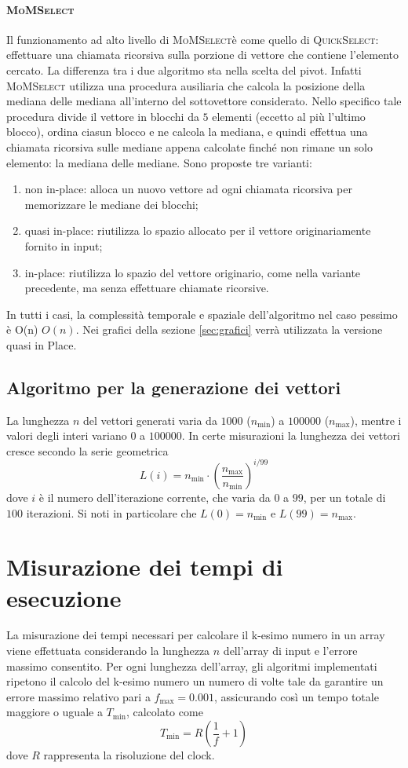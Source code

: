 \documentclass[a4paper]{article}
\newcommand{\QuickSelect}{\textsc{QuickSelect}}
\newcommand{\MoMSelect}{\textsc{MoMSelect}}
\newcommand{\Olin}{\ifmmode O(n) \else $O(n)$\fi} %
\begin{document}
\paragraph{\MoMSelect}
Il funzionamento ad alto livello di \MoMSelect è come quello di \QuickSelect: effettuare una chiamata ricorsiva sulla porzione di vettore che contiene l'elemento cercato.
La differenza tra i due algoritmo sta nella scelta del pivot.
Infatti \MoMSelect{} utilizza una procedura ausiliaria che calcola la posizione della mediana delle mediana all'interno del sottovettore considerato.
Nello specifico tale procedura divide il vettore in blocchi da $5$ elementi (eccetto al più l'ultimo blocco), ordina ciasun blocco e ne calcola la mediana, e quindi effettua una chiamata ricorsiva sulle mediane appena calcolate finché non rimane un solo elemento: la mediana delle mediane.
Sono proposte tre varianti:
\begin{enumerate}
    \item non in-place: alloca un nuovo vettore ad ogni chiamata ricorsiva per memorizzare le mediane dei blocchi;
    \item quasi in-place: riutilizza lo spazio allocato per il vettore originariamente fornito in input;
    \item in-place: riutilizza lo spazio del vettore originario, come nella variante precedente, ma senza effettuare chiamate ricorsive.
\end{enumerate}

In tutti i casi, la complessità temporale e spaziale dell'algoritmo nel caso pessimo è \Olin. 
Nei grafici della sezione \ref{sec:grafici} verrà utilizzata la versione quasi in Place.

\subsection{Algoritmo per la generazione dei vettori}
La lunghezza $n$ del vettori generati varia da $1000$ ($n_{\min}$) a $100000$ ($n_{\max}$), mentre i valori degli interi variano $0$ a $100000$.
In certe misurazioni la lunghezza dei vettori cresce secondo la serie geometrica
\[
    L(i) = n_{\min} \cdot \left(\frac{n_{\max}}{n_{\min}}\right)^{i/99}
\]
dove $i$ è il numero dell'iterazione corrente, che varia da $0$ a $99$, per un totale di $100$ iterazioni.
Si noti in particolare che $L(0) = n_{\min}$ e $L(99) = n_{\max}$.


\section{Misurazione dei tempi di esecuzione}
\label{sec:misurazione}
La misurazione dei tempi necessari per calcolare il k-esimo numero in un array viene effettuata considerando la lunghezza \( n \) dell'array di input e l'errore massimo consentito. Per ogni lunghezza dell'array, gli algoritmi implementati ripetono il calcolo del k-esimo numero un numero di volte tale da garantire un errore massimo relativo pari a \( f_{\max} = 0.001 \), assicurando così un tempo totale maggiore o uguale a \( T_{\min} \), calcolato come \[ T_{\min} = R \left( \frac{1}{f} + 1 \right) \] dove \( R \) rappresenta la risoluzione del clock.
\end{document}
